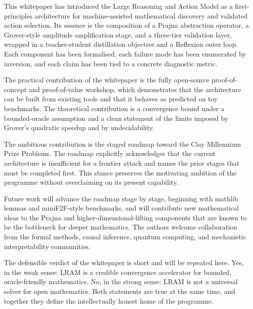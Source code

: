 This whitepaper has introduced the Large Reasoning and Action Model as a first-principles architecture for machine-assisted mathematical discovery and validated action selection. Its essence is the composition of a Prajna abstraction operator, a Grover-style amplitude amplification stage, and a three-tier validation layer, wrapped in a teacher-student distillation objective and a Reflexion outer loop. Each component has been formalised, each failure mode has been enumerated by inversion, and each claim has been tied to a concrete diagnostic metric.

The practical contribution of the whitepaper is the fully open-source proof-of-concept and proof-of-value workshop, which demonstrates that the architecture can be built from existing tools and that it behaves as predicted on toy benchmarks. The theoretical contribution is a convergence bound under a bounded-oracle assumption and a clean statement of the limits imposed by Grover's quadratic speedup and by undecidability.

The ambitious contribution is the staged roadmap toward the Clay Millennium Prize Problems. The roadmap explicitly acknowledges that the current architecture is insufficient for a frontier attack and names the prior stages that must be completed first. This stance preserves the motivating ambition of the programme without overclaiming on its present capability.

Future work will advance the roadmap stage by stage, beginning with mathlib lemmas and miniF2F-style benchmarks, and will contribute new mathematical ideas to the Prajna and higher-dimensional-lifting components that are known to be the bottleneck for deeper mathematics. The authors welcome collaboration from the formal methods, causal inference, quantum computing, and mechanistic interpretability communities.

The defensible verdict of the whitepaper is short and will be repeated here. Yes, in the weak sense: LRAM is a credible convergence accelerator for bounded, oracle-friendly mathematics. No, in the strong sense: LRAM is not a universal solver for open mathematics. Both statements are true at the same time, and together they define the intellectually honest home of the programme.
